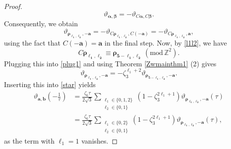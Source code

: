 \documentclass[10pt,a4paper]{amsart}
\renewcommand{\a}{\alpha}
\renewcommand{\b}{\beta}
\renewcommand{\pmod}[1]{\ \left( \mathrm{mod} \, #1 \right)}
\renewcommand{\t}{\tau}
\newcommand{\z}{\zeta}
\begin{document}
\begin{proof}
\[
\vartheta_{\bm{\a},\bm{\b}}=-\vartheta_{C\bm{\a},C\bm{\b}}.
\]
Consequently, we obtain
\begin{equation}\label{plug1}%
\vartheta_{\bm{\rho_{\ell_1,\ell_2}},-\bm{a}}=-\vartheta_{C\bm{\rho_{\ell_1,\ell_2}},C(-\bm{a})}=-\vartheta_{C\bm{\rho_{\ell_1,\ell_2}},\bm{a}},
\end{equation}
 using the fact that $C(-\bm{a})=\bm{a}$ in the final step. Now, by \eqref{l1l2}, we have 
\[
C\bm{\rho_{\ell_1,\ell_2}}\equiv \bm{\rho_{5-\ell_1,\ell_2}}\pmod{\mathbb{Z}^2}.
\]
Plugging this into \eqref{plug1} and using Theorem \ref{Zwmainthm1} (2) gives 
\[
\vartheta_{\bm{\rho_{\ell_1,\ell_2}},-\bm{a}}%
=-\z^{\ell_1+2}_3\vartheta_{\bm{\rho_{5-\ell_1,\ell_2}},-\bm{a}}.
\]
 Inserting this into \eqref{star} yields 
\begin{align}\label{ref3}
\vartheta_{\bm{a},\bm{b}}\left(-\frac{1}{\t}\right)&=\frac{\z_6\t}{2\sqrt{3}}\sum_{\substack{\ell_1\in\{0,1,2\}\\\ell_2\in\{0,1\}}}\left(1-\z^{2\ell_1+1}_3\right)\vartheta_{\bm{\rho_{\ell_1,\ell_2}},-\bm{a}}(\t)\nonumber\\
&=\frac{\z_6\t}{2\sqrt{3}}\sum_{\substack{\ell_1\in\{0,2\}\\\ell_2\in\{0,1\}}}\left(1-\z^{2\ell_1+1}_3\right)\vartheta_{\bm{\rho_{\ell_1,\ell_2}},-\bm{a}}(\t),
\end{align}
as the term with $\ell_1=1$ vanishes.


\end{proof}
\end{document}
